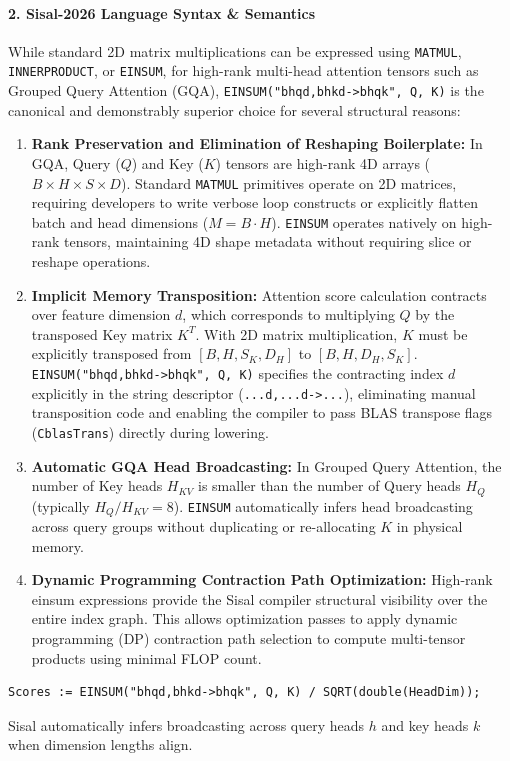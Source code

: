 \paragraph{2. Sisal-2026 Language Syntax \& Semantics}
While standard 2D matrix multiplications can be expressed using \texttt{MATMUL}, \texttt{INNERPRODUCT}, or \texttt{EINSUM}, for high-rank multi-head attention tensors such as Grouped Query Attention (GQA), \texttt{EINSUM("bhqd,bhkd->bhqk", Q, K)} is the canonical and demonstrably superior choice for several structural reasons:
\begin{enumerate}
    \item \textbf{Rank Preservation and Elimination of Reshaping Boilerplate:} In GQA, Query ($Q$) and Key ($K$) tensors are high-rank 4D arrays ($B \times H \times S \times D$). Standard \texttt{MATMUL} primitives operate on 2D matrices, requiring developers to write verbose loop constructs or explicitly flatten batch and head dimensions ($M = B \cdot H$). \texttt{EINSUM} operates natively on high-rank tensors, maintaining 4D shape metadata without requiring slice or reshape operations.
    \item \textbf{Implicit Memory Transposition:} Attention score calculation contracts over feature dimension $d$, which corresponds to multiplying $Q$ by the transposed Key matrix $K^T$. With 2D matrix multiplication, $K$ must be explicitly transposed from $[B, H, S_K, D_H]$ to $[B, H, D_H, S_K]$. \texttt{EINSUM("bhqd,bhkd->bhqk", Q, K)} specifies the contracting index $d$ explicitly in the string descriptor (\texttt{...d,...d->...}), eliminating manual transposition code and enabling the compiler to pass BLAS transpose flags (\texttt{CblasTrans}) directly during lowering.
    \item \textbf{Automatic GQA Head Broadcasting:} In Grouped Query Attention, the number of Key heads $H_{KV}$ is smaller than the number of Query heads $H_Q$ (typically $H_Q / H_{KV} = 8$). \texttt{EINSUM} automatically infers head broadcasting across query groups without duplicating or re-allocating $K$ in physical memory.
    \item \textbf{Dynamic Programming Contraction Path Optimization:} High-rank einsum expressions provide the Sisal compiler structural visibility over the entire index graph. This allows optimization passes to apply dynamic programming (DP) contraction path selection to compute multi-tensor products using minimal FLOP count.
\end{enumerate}
\begin{lstlisting}[language=Sisal]
Scores := EINSUM("bhqd,bhkd->bhqk", Q, K) / SQRT(double(HeadDim));
\end{lstlisting}
Sisal automatically infers broadcasting across query heads $h$ and key heads $k$ when dimension lengths align.

